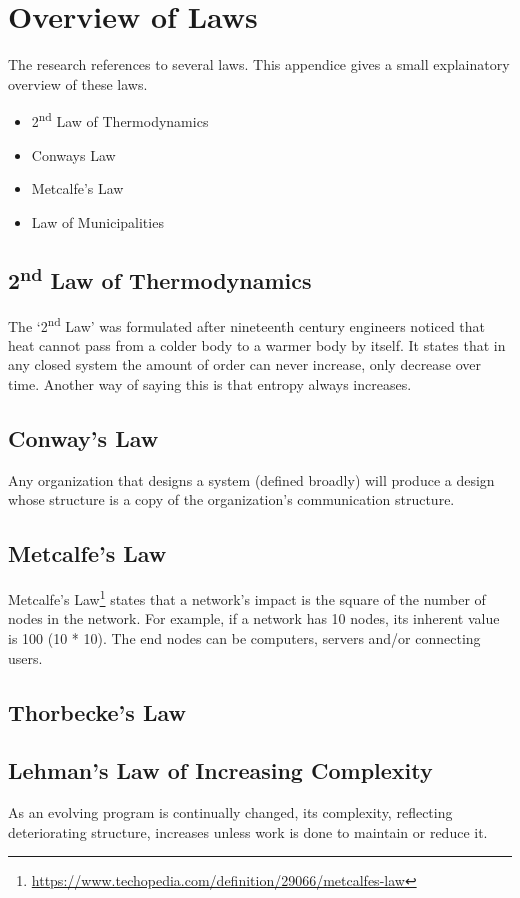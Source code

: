 \chapter{Overview of Laws}
\setcounter{footnote}{0}
The research references to several laws. This appendice gives a small explainatory overview of these laws.

\begin{itemize}
	\item{2\textsuperscript{nd} Law of Thermodynamics}
	\item{Conways Law}
	\item{Metcalfe's Law}
	\item{Law of Municipalities}
\end{itemize}

\section{2\textsuperscript{nd} Law of Thermodynamics}
\label{sec:appendix2ndlawthermodynamics}
The ‘2\textsuperscript{nd} Law’ was formulated after nineteenth century engineers noticed that heat cannot pass from a colder body to a warmer body by itself. It states that in any closed system the amount of order can never increase, only decrease over time. Another way of saying this is that entropy always increases.

\section{Conway's Law}
Any organization that designs a system (defined broadly) will produce a design whose structure is a copy of the organization's communication structure.

\section{Metcalfe's Law}
Metcalfe's Law\footnote{\url{https://www.techopedia.com/definition/29066/metcalfes-law}} states that a network's impact is the square of the number of nodes in the network. For example, if a network has 10 nodes, its inherent value is 100 (10 * 10). The end nodes can be computers, servers and/or connecting users.

\section{Thorbecke's Law}

\section{Lehman's Law of Increasing Complexity}
As an evolving program is continually changed, its complexity, reflecting deteriorating structure, increases unless work is done to maintain or reduce it.

